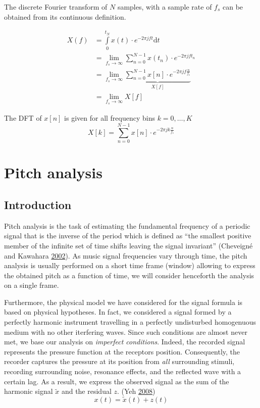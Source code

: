 \documentclass[american,]{article}
\begin{document}
The discrete Fourier transform of \(N\) samples,
with a sample rate of \(f_s\) can be obtained
from its continuous definition.

\begin{align}
X(f) &= \int\limits_{0}^{t_N} x(t)\cdot e^{-2\pi j ft}\mathrm{d}t\\
    &= \lim\limits_{f_s\rightarrow\infty} \sum\limits_{n=0}^{N-1}
        x(t_n)\cdot e^{-2\pi j ft_n}\\
    &= \lim\limits_{f_s\rightarrow\infty} \underbrace{\sum\limits_{n=0}^{N-1} x[n]\cdot e^{-2\pi j f \frac{n}{f_s}}}_{X[f]}\\
    &= \lim\limits_{f_s\rightarrow\infty} X[f]
\end{align}

The DFT of \(x[n]\) is given for all frequency bins
\(k=0,\ldots,K\)
\[X[k] = \sum\limits_{n=0}^{N-1} x[n]\cdot e^{-2\pi j k \frac{n}{f_s}}\]

\pagebreak

\hypertarget{pitch-analysis}{%
\section{Pitch analysis}\label{pitch-analysis}}

\hypertarget{introduction-1}{%
\subsection{Introduction}\label{introduction-1}}

Pitch analysis is the task of estimating the fundamental
frequency of a periodic signal that is the inverse
of the period which is defined as
``the smallest positive member of the infinite set of time
shifts leaving the signal invariant'' (Cheveigné and Kawahara \protect\hyperlink{ref-yin_2002}{2002}).
As music signal frequencies vary through time,
the pitch analysis is usually performed on a short time frame (window)
allowing to express the obtained pitch as a function of time,
we will consider henceforth the analysis on a single frame.

Furthermore, the physical model we have considered
for the signal formula is based on physical hypotheses.
In fact, we considered a signal formed by a perfectly
harmonic instrument travelling in a perfectly undisturbed
homogenuous medium with no other iterfering waves.
Since such conditions are almost never met, we base our
analysis on \emph{imperfect conditions}.
Indeed, the recorded signal represents the pressure function
at the receptors position.
Consequently, the recorder captures the pressure
at its position from \emph{all} surrounding stimuli,
recording surrounding noise, resonance effects,
and the reflected wave with a certain lag.
As a result, we express the observed signal
as the sum of the harmonic signal \(\tilde{x}\) and
the residual \(z\). (Yeh \protect\hyperlink{ref-yeh_thesis}{2008})
\[x(t) = \tilde{x}(t) + z(t)\]
\end{document}
